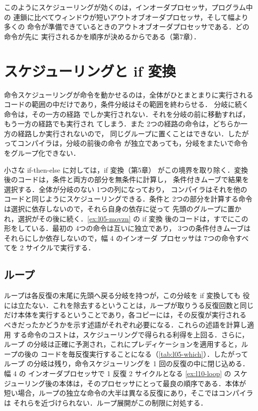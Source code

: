 \documentclass[../main.tex]{subfiles}
\begin{document}
このようにスケジューリングが効くのは，インオーダプロセッサ，プログラム中の
連鎖に比べてウィンドウが短いアウトオブオーダプロセッサ，そして幅より多くの
命令が準備できているときのアウトオブオーダプロセッサである．どの命令が先に
実行されるかを順序が決めるからである（第7章）．

\section{スケジューリングと if 変換}
\label{sec:l10-if-conversion}

命令スケジューリングが命令を動かせるのは，全体がひとまとまりに実行される
コードの範囲の中だけであり，条件分岐はその範囲を終わらせる．
分岐に続く命令は，その一方の経路
でしか実行されない．それを分岐の前に移動すれば，もう一方の経路でも実行され
てしまう．また 2つの経路の命令は，どちらか一方の経路しか実行されないので，
同じグループに置くことはできない．したがってコンパイラは，分岐の前後の命令
が独立であっても，分岐をまたいで命令をグループ化できない．

小さな if-then-else に対しては，if 変換（第5章）
がこの境界を取り除く．変換後のコードは，条件と両方の部分を無条件に計算し，
条件付きムーブで結果を選択する．全体が分岐のない 1つの列になっており，
コンパイラはそれを他のコードと同じようにスケジューリングできる．条件と
2つの部分を計算する命令は選択に依存しないので，それら自身の依存に従って
先頭のグループに置かれ，選択がその後に続く．\cref{ex:l05-movzn} の if 変換
後のコードは，すでにこの形をしている．最初の 4つの命令は互いに独立であり，
3つの条件付きムーブはそれらにしか依存しないので，幅 4 のインオーダ
プロセッサは 7つの命令すべてを 2 サイクルで実行する．

\subsection{ループ}

ループは各反復の末尾に先頭へ戻る分岐を持つが，この分岐を if 変換しても
役には立たない．これを除去するということは，ループが取りうる反復回数と同じ
だけ本体を実行するということであり，各コピーには，その反復が実行される
べきだったかどうかを示す述語がそれぞれ必要になる．これらの述語を計算し適用
する命令のコストは，スケジューリングで得られる利得を上回る．さらに，ループ
の分岐は正確に予測され，これにプレディケーションを適用すると，ループの後の
コードを毎反復実行することになる（\cref{tab:l05-which}）．したがってループ
の分岐は残り，命令スケジューリングを 1 回の反復の中に閉じ込める．幅 4 の
インオーダプロセッサで 1 反復 2 サイクルとなる \cref{ex:l10-loop} の
スケジューリング後の本体は，そのプロセッサにとって最良の順序である．本体が
短い場合，ループの独立な命令の大半は異なる反復にあり，そこではコンパイラは
それらを近づけられない．ループ展開がこの制限に対処する．
\end{document}
